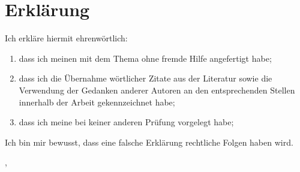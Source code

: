 
\thispagestyle{empty}

\section*{Erklärung}
\vspace*{2em}

Ich erkläre hiermit ehrenwörtlich: \\
\begin{enumerate}
\item dass ich meinen {\arbeitsart} mit dem Thema
{\itshape \titel } ohne fremde Hilfe angefertigt habe;
\item dass ich die Übernahme wörtlicher Zitate aus der Literatur sowie die Verwendung der Gedanken
anderer Autoren an den entsprechenden Stellen innerhalb der Arbeit gekennzeichnet habe;
\item dass ich meine {\arbeitsart} bei keiner anderen Prüfung vorgelegt habe;
\end{enumerate}

Ich bin mir bewusst, dass eine falsche Erklärung rechtliche Folgen haben wird.

\vspace{3em}

\abgabeort, \datumAbgabe
\vspace{4em}

\autor
